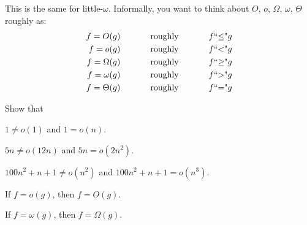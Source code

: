 This is the same for little-$\omega$.
Informally, you want to think about $O$, $o$, $\Omega$, $\omega$, $\Theta$ roughly as:
\begin{align*}
f = O(g)      &\text{ \hspace{1cm} roughly \hspace{1cm} } f \text{\lq\lq$\leq$"} g \\
f = o(g)      &\text{ \hspace{1cm} roughly \hspace{1cm} } f \text{\lq\lq$<$"} g \\
f = \Omega(g) &\text{ \hspace{1cm} roughly \hspace{1cm} } f \text{\lq\lq$\geq$"} g \\
f = \omega(g) &\text{ \hspace{1cm} roughly \hspace{1cm} } f \text{\lq\lq$>$"} g \\
f = \Theta(g) &\text{ \hspace{1cm} roughly \hspace{1cm} } f \text{\lq\lq$=$"} g \\
\end{align*}

\begin{ex}
  Show that
  \begin{myenum}
  \item $1 \neq o(1)$ and $1 = o(n)$.
  \item $5n \neq o(12n)$ and $5n = o(2n^2)$.
  \item $100n^2 + n + 1 \neq o(n^2)$ and $100n^2 + n + 1 = o(n^3)$.
  \end{myenum}
\end{ex}


\begin{prop}
\mbox{}
\begin{myenum}
\item If $f = o(g)$, then $f = O(g)$. 
\item If $f = \omega(g)$, then $f = \Omega(g)$. 
\end{myenum}
\end{prop}



